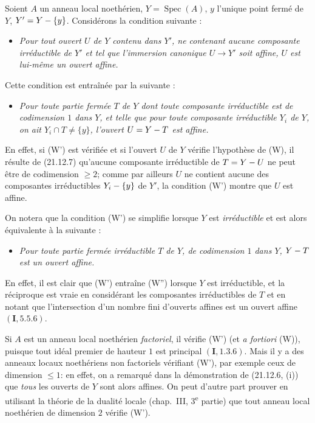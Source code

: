\begin{env}[21.12.8]
\label{IV.21.12.8}
Soient $A$ un anneau local noethérien, $Y=\operatorname{Spec}(A)$, $y$ l'unique point
fermé de $Y$, $Y'=Y-\{y\}$. Considérons la condition suivante :
\begin{itemize}
  \item[\textup{(W)}] \emph{Pour tout ouvert $U$ de $Y$ contenu dans $Y'$, ne
  contenant aucune composante irréductible de $Y'$ et tel que l'immersion canonique
  $U\to Y'$ soit affine, $U$ est lui-même un ouvert affine.}
\end{itemize}

Cette condition est entraînée par la suivante :
\begin{itemize}
  \item[\textup{(W')}] \emph{Pour toute partie fermée $T$ de $Y$ dont toute composante
  irréductible est de codimension $1$ dans $Y$, et telle que pour toute composante
  irréductible $Y_i$ de $Y$, on ait $Y_i\cap T\ne\{y\}$, l'ouvert $U=Y- T$ est affine.}
\end{itemize}

En effet, si (W') est vérifiée et si l'ouvert $U$ de $Y$ vérifie l'hypothèse de (W), il
résulte de (21.12.7) qu'aucune composante irréductible de $T=Y- U$ ne peut être de
codimension $\geq2$; comme par ailleurs $U$ ne contient aucune des composantes
irréductibles $Y_i-\{y\}$ de $Y'$, la condition (W') montre que $U$ est affine.

On notera que la condition (W') se simplifie lorsque $Y$ est \emph{irréductible} et est
alors équivalente à la suivante :
\begin{itemize}
  \item[\textup{(W'')}] \emph{Pour toute partie fermée irréductible $T$ de $Y$, de
  codimension $1$ dans $Y$, $Y- T$ est un ouvert affine.}
\end{itemize}

En effet, il est clair que (W') entraîne (W'') lorsque $Y$ est irréductible, et la
réciproque est vraie en considérant les composantes irréductibles de $T$ et en notant
que l'intersection d'un nombre fini d'ouverts affines est un ouvert affine
$(\mathbf I, 5.5.6)$.
\end{env}

\begin{examples}[21.12.9]
\label{IV.21.12.9}
Si $A$ est un anneau local noethérien \emph{factoriel}, il vérifie (W') (et
\emph{a fortiori} (W)), puisque tout idéal premier de hauteur $1$ est principal
$(\mathbf I, 1.3.6)$. Mais il y a des anneaux locaux noethériens non factoriels
vérifiant (W'), par exemple ceux de dimension $\leq1$: en effet, on a remarqué dans la
démonstration de (21.12.6, (i)) que \emph{tous} les ouverts de $Y$ sont alors affines.
On peut d'autre part prouver en utilisant la théorie de la dualité locale (chap.~III,
3\textsuperscript{e} partie) que tout anneau local noethérien de dimension $2$ vérifie
(W').
\end{examples}

